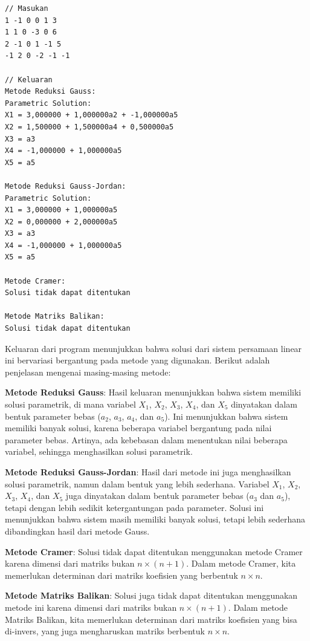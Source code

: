 \begin{enumerate}[label=(\alph*)]
\begin{lstlisting}[caption = spl-1b.txt]
// Masukan
1 -1 0 0 1 3
1 1 0 -3 0 6
2 -1 0 1 -1 5
-1 2 0 -2 -1 -1

// Keluaran
Metode Reduksi Gauss:
Parametric Solution:
X1 = 3,000000 + 1,000000a2 + -1,000000a5
X2 = 1,500000 + 1,500000a4 + 0,500000a5
X3 = a3
X4 = -1,000000 + 1,000000a5
X5 = a5

Metode Reduksi Gauss-Jordan:
Parametric Solution:
X1 = 3,000000 + 1,000000a5
X2 = 0,000000 + 2,000000a5
X3 = a3
X4 = -1,000000 + 1,000000a5
X5 = a5

Metode Cramer:
Solusi tidak dapat ditentukan

Metode Matriks Balikan:
Solusi tidak dapat ditentukan\end{lstlisting}

Keluaran dari program menunjukkan bahwa solusi dari sistem persamaan linear ini bervariasi bergantung pada metode yang digunakan. Berikut adalah penjelasan mengenai masing-masing metode:

\textbf{Metode Reduksi Gauss}: Hasil keluaran menunjukkan bahwa sistem memiliki solusi parametrik, di mana variabel \( X_1 \), \( X_2 \), \( X_3 \), \( X_4 \), dan \( X_5 \) dinyatakan dalam bentuk parameter bebas (\( a_2 \), \( a_3 \), \( a_4 \), dan \( a_5 \)). Ini menunjukkan bahwa sistem memiliki banyak solusi, karena beberapa variabel bergantung pada nilai parameter bebas. Artinya, ada kebebasan dalam menentukan nilai beberapa variabel, sehingga menghasilkan solusi parametrik.

\textbf{Metode Reduksi Gauss-Jordan}: Hasil dari metode ini juga menghasilkan solusi parametrik, namun dalam bentuk yang lebih sederhana. Variabel \( X_1 \), \( X_2 \), \( X_3 \), \( X_4 \), dan \( X_5 \) juga dinyatakan dalam bentuk parameter bebas (\( a_3 \) dan \( a_5 \)), tetapi dengan lebih sedikit ketergantungan pada parameter. Solusi ini menunjukkan bahwa sistem masih memiliki banyak solusi, tetapi lebih sederhana dibandingkan hasil dari metode Gauss.

\textbf{Metode Cramer}: Solusi tidak dapat ditentukan menggunakan metode Cramer karena dimensi dari matriks bukan \(n \times (n+1)\). Dalam metode Cramer, kita memerlukan determinan dari matriks koefisien yang berbentuk \(n \times n\).

\textbf{Metode Matriks Balikan}: Solusi juga tidak dapat ditentukan menggunakan metode ini karena dimensi dari matriks bukan \(n \times (n+1)\). Dalam metode Matriks Balikan, kita memerlukan determinan dari matriks koefisien yang bisa di-invers, yang juga mengharuskan matriks berbentuk \(n \times n\).


\end{enumerate}
